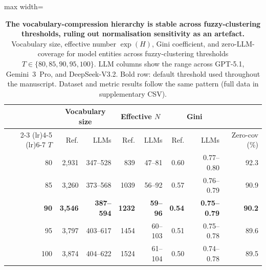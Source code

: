 \begin{table}[h]
\centering
\caption{\textbf{The vocabulary-compression hierarchy is stable across fuzzy-clustering thresholds, ruling out normalisation sensitivity as an artefact.} Vocabulary size, effective number $\exp(H)$, Gini coefficient, and zero-LLM-coverage for model entities across fuzzy-clustering thresholds $T \in \{80, 85, 90, 95, 100\}$. LLM columns show the range across GPT-5.1, Gemini~3~Pro, and DeepSeek-V3.2. Bold row: default threshold used throughout the manuscript. Dataset and metric results follow the same pattern (full data in supplementary CSV).}
\label{tab:normalisation_sensitivity}
\begin{adjustbox}{max width=\textwidth}
\begin{tabular}{r rr rr rr r}
\toprule
& \multicolumn{2}{c}{Vocabulary size} & \multicolumn{2}{c}{Effective $N$} & \multicolumn{2}{c}{Gini} & \\
\cmidrule(lr){2-3} \cmidrule(lr){4-5} \cmidrule(lr){6-7}
$T$ & Ref. & LLMs & Ref. & LLMs & Ref. & LLMs & Zero-cov (\%) \\
\midrule
80 & 2,931 & 347--528 & 839 & 47--81 & 0.60 & 0.77--0.80 & 92.3 \\
85 & 3,260 & 373--568 & 1039 & 56--92 & 0.57 & 0.76--0.79 & 90.9 \\
\textbf{90} & \textbf{3,546} & \textbf{387--594} & \textbf{1232} & \textbf{59--96} & \textbf{0.54} & \textbf{0.75--0.79} & \textbf{90.2} \\
95 & 3,797 & 403--617 & 1454 & 60--103 & 0.51 & 0.75--0.78 & 89.6 \\
100 & 3,874 & 404--622 & 1524 & 61--104 & 0.50 & 0.74--0.78 & 89.5 \\
\bottomrule
\end{tabular}
\end{adjustbox}
\end{table}
